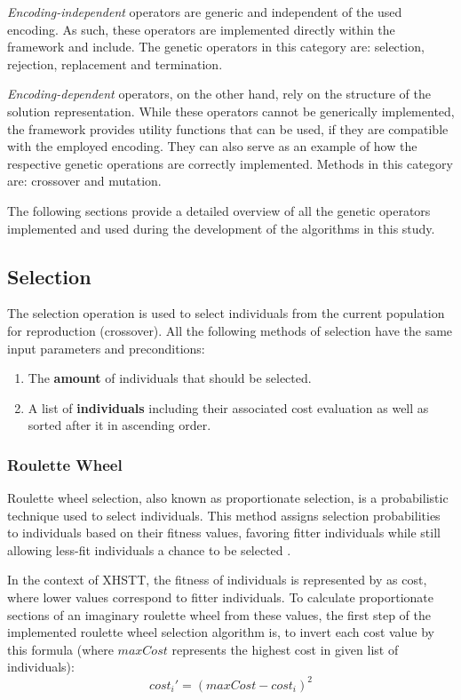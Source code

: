 \documentclass[english,examples]{isasthesis}
\begin{document}
\textit{Encoding-independent} operators are generic and independent of the
used encoding. As such, these operators are implemented directly within the
framework and include. The genetic operators in this category are:
selection, rejection, replacement and termination.

\textit{Encoding-dependent} operators, on the other hand, rely on the structure
of the solution representation. While these operators cannot be generically
implemented, the framework provides utility functions that can be used, if they
are compatible with the employed encoding. They can also serve as an example of
how the respective genetic operations are correctly implemented. Methods in
this category are: crossover and mutation.

The following sections provide a detailed overview of all the genetic operators
implemented and used during the development of the algorithms in this study.

\subsection{Selection}
The selection operation is used to select individuals from the current
population for reproduction (crossover). All the following methods of selection
have the same input parameters and preconditions:
\begin{enumerate}
    \item   The \textbf{amount} of individuals that should be selected.
    \item   A list of \textbf{individuals} including their associated cost
            evaluation as well as sorted after it in ascending order.
\end{enumerate}

\subsubsection{Roulette Wheel}
Roulette wheel selection, also known as proportionate selection, is a
probabilistic technique used to select individuals. This method assigns
selection probabilities to individuals based on their fitness values, favoring
fitter individuals while still allowing less-fit individuals a chance to be
selected \cite{Affenzeller2009}.

In the context of XHSTT, the fitness of individuals is represented by as cost,
where lower values correspond to fitter individuals. To calculate proportionate
sections of an imaginary roulette wheel from these values, the first step
of the implemented roulette wheel selection algorithm is, to invert each cost
value by this formula (where $maxCost$ represents the highest cost in given list
of individuals):
\begin{equation}
    cost_i' = (maxCost - cost_i)^2
\end{equation}
\end{document}
